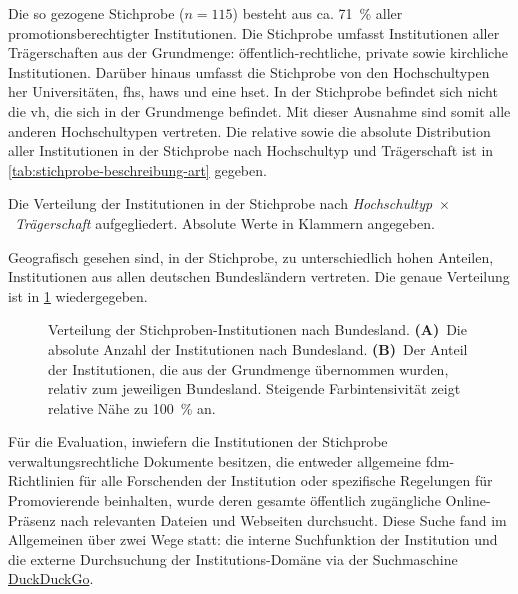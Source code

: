 Die so gezogene Stichprobe ($n=115$) besteht aus ca. \SI{71}{\percent} aller promotionsberechtigter Institutionen.
Die Stichprobe umfasst Institutionen aller Trägerschaften aus der Grundmenge: öffentlich-rechtliche, private sowie kirchliche Institutionen.
Darüber hinaus umfasst die Stichprobe von den Hochschultypen her Universitäten, \glspl{fh}, \glspl{haw} und eine \gls{hset}.
In der Stichprobe befindet sich nicht die \gls{vh}, die sich in der Grundmenge befindet.
Mit dieser Ausnahme sind somit alle anderen Hochschultypen vertreten.
Die relative sowie die absolute Distribution aller Institutionen in der Stichprobe nach Hochschultyp und Trägerschaft ist in \cref{tab:stichprobe-beschreibung-art} gegeben.
\begin{table}[!htbp]
	\caption{Die Verteilung der Institutionen in der Stichprobe nach \textit{Hochschultyp}~$\times$~\textit{Trägerschaft} aufgegliedert. Absolute Werte in Klammern angegeben.}
    
	\label{tab:stichprobe-beschreibung-art}
\end{table}

\noindent Geografisch gesehen sind, in der Stichprobe, zu unterschiedlich hohen Anteilen, Institutionen aus allen deutschen Bundesländern vertreten.
Die genaue Verteilung ist in \cref{fig:DE-stichprobe-beschreibung} wiedergegeben.
\begin{figure}[!htbp]
    \centering
    
    \caption{Verteilung der Stichproben-Institutionen nach Bundesland. \textbf{(A)}~Die absolute Anzahl der Institutionen nach Bundesland.
    \textbf{(B)}~Der Anteil der Institutionen, die aus der Grundmenge übernommen wurden, relativ zum jeweiligen Bundesland.
    Steigende Farbintensivität zeigt relative Nähe zu \SI{100}{\percent} an.}
    \label{fig:DE-stichprobe-beschreibung}
\end{figure}

Für die Evaluation, inwiefern die Institutionen der Stichprobe verwaltungsrechtliche Dokumente besitzen, die entweder allgemeine \gls{fdm}-Richtlinien für alle Forschenden der Institution oder spezifische Regelungen für Promovierende beinhalten, wurde deren gesamte öffentlich zugängliche Online-Präsenz nach relevanten Dateien und Webseiten durchsucht.
Diese Suche fand im Allgemeinen über zwei Wege statt:
die interne Suchfunktion der Institution und die externe Durchsuchung der Institutions-Domäne via der Suchmaschine \href{https://www.duckduckgo.com/}{DuckDuckGo}.


